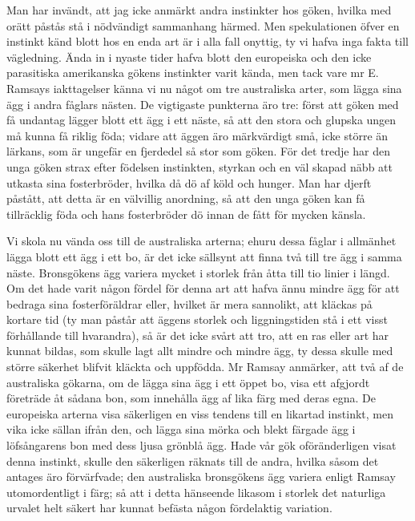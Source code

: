Man har invändt, att jag icke anmärkt andra instinkter hos göken, hvilka med orätt påstås stå i nödvändigt sammanhang härmed. Men spekulationen öfver en instinkt känd blott hos en enda art är i alla fall onyttig, ty vi hafva inga fakta till vägledning. Ända in i nyaste tider hafva blott den europeiska och den icke parasitiska amerikanska gökens instinkter varit kända, men tack vare mr E. Ramsays iakttagelser känna vi nu något om tre australiska arter, som lägga sina ägg i andra fåglars nästen. De vigtigaste punkterna äro tre: först att göken med få undantag lägger blott ett ägg i ett näste, så att den stora och glupska ungen må kunna få riklig föda; vidare att äggen äro märkvärdigt små, icke större än lärkans, som är ungefär en fjerdedel så stor som göken. För det tredje har den unga göken strax efter födelsen instinkten, styrkan och en väl skapad näbb att utkasta sina fosterbröder, hvilka då dö af köld och hunger. Man har djerft påstått, att detta är en välvillig anordning, så att den unga göken kan få tillräcklig föda och hans fosterbröder dö innan de fått för mycken känsla.

Vi skola nu vända oss till de australiska arterna; ehuru dessa fåglar i allmänhet lägga blott ett ägg i ett bo, är det icke sällsynt att finna två till tre ägg i samma näste. Bronsgökens ägg variera mycket i storlek från åtta till tio linier i längd. Om det hade varit någon fördel för denna art att hafva ännu mindre ägg för att bedraga sina fosterföräldrar eller, hvilket är mera sannolikt, att kläckas på kortare tid (ty man påstår att äggens storlek och liggningstiden stå i ett visst förhållande till hvarandra), så är det icke svårt att tro, att en ras eller art har kunnat bildas, som skulle lagt allt mindre och mindre ägg, ty dessa skulle med större säkerhet blifvit kläckta och uppfödda. Mr Ramsay anmärker, att två af de australiska gökarna, om de lägga sina ägg i ett öppet bo, visa ett afgjordt företräde åt sådana bon, som innehålla ägg af lika färg med deras egna. De europeiska arterna visa säkerligen en viss tendens till en likartad instinkt, men vika icke sällan ifrån den, och lägga sina mörka och blekt färgade ägg i löfsångarens bon med dess ljusa grönblå ägg. Hade vår gök oföränderligen visat denna instinkt, skulle den säkerligen räknats till de andra, hvilka såsom det antages äro förvärfvade; den australiska bronsgökens ägg variera enligt Ramsay utomordentligt i färg; så att i detta hänseende likasom i storlek det naturliga urvalet helt säkert har kunnat befästa någon fördelaktig variation.


